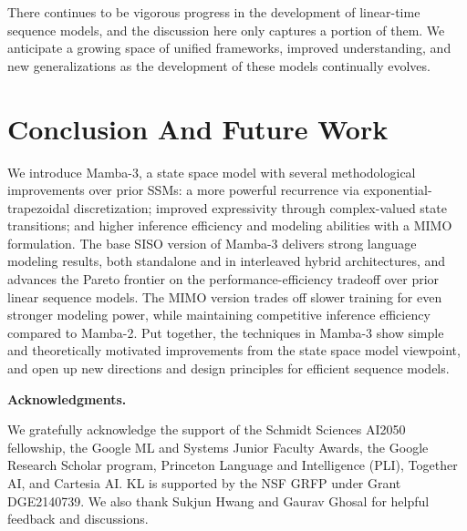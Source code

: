 \documentclass{article}
\theoremstyle{plain}
\theoremstyle{definition}
\theoremstyle{remark}
\begin{document}
There continues to be vigorous progress in the development of linear-time sequence models, and the discussion here only captures a portion of them.
We anticipate a growing space of unified frameworks, improved understanding, and new generalizations as the development of these models continually evolves.

\section{Conclusion And Future Work}
We introduce Mamba-3, a state space model with several methodological improvements over prior SSMs: a more powerful recurrence via exponential-trapezoidal discretization; improved expressivity through complex-valued state transitions; and higher inference efficiency and modeling abilities with a MIMO formulation.
The base SISO version of Mamba-3 delivers strong language modeling results, both standalone and in interleaved hybrid architectures, and advances the Pareto frontier on the performance-efficiency tradeoff over prior linear sequence models.
The MIMO version trades off slower training for even stronger modeling power, while maintaining competitive inference efficiency compared to Mamba-2.
Put together, the techniques in Mamba-3 show simple and theoretically motivated improvements from the state space model viewpoint, and open up new directions and design principles for efficient sequence models.

\textbf{Acknowledgments.}

We gratefully acknowledge the support of the Schmidt Sciences AI2050 fellowship, the Google ML and Systems Junior Faculty Awards, the Google Research Scholar program, Princeton Language and Intelligence (PLI), Together AI, and Cartesia AI. 
KL is supported by the NSF GRFP under Grant DGE2140739.
We also thank Sukjun Hwang and Gaurav Ghosal for helpful feedback and discussions.

\printbibliography

\newpage

\appendix
\end{document}
